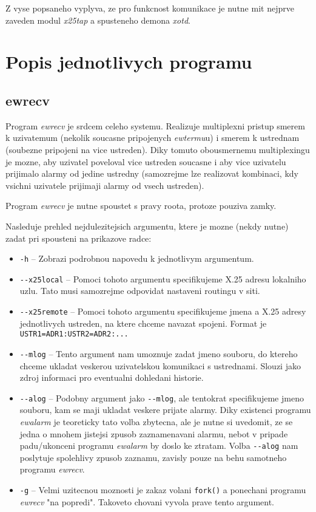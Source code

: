 \documentclass[a4paper,12pt]{article}
\begin{document}
Z vyse popsaneho vyplyva, ze pro funkcnost komunikace je nutne mit nejprve
zaveden modul \emph{x25tap} a spusteneho demona \emph{xotd}.

\section{Popis jednotlivych programu}

\subsection{ewrecv}

Program \emph{ewrecv} je srdcem celeho systemu. Realizuje multiplexni pristup
smerem k uzivatemum (nekolik soucasne pripojenych \emph{ewtermu}u) i smerem
k ustrednam (soubezne pripojeni na vice ustreden). Diky tomuto obousmernemu
multiplexingu je mozne, aby uzivatel poveloval vice ustreden soucasne i aby
vice uzivatelu prijimalo alarmy od jedine ustredny (samozrejme lze realizovat
kombinaci, kdy vsichni uzivatele prijimaji alarmy od vsech ustreden).

Program \emph{ewrecv} je nutne spoustet s pravy roota, protoze pouziva zamky.

Nasleduje prehled nejdulezitejsich argumentu, ktere je mozne (nekdy nutne)
zadat pri spousteni na prikazove radce:

\begin{itemize}
\item \verb!-h! -- Zobrazi podrobnou napovedu k jednotlivym argumentum.
\item \verb!--x25local! -- Pomoci tohoto argumentu specifikujeme X.25 adresu
lokalniho uzlu. Tato musi samozrejme odpovidat nastaveni routingu v siti.
\item \verb!--x25remote! -- Pomoci tohoto argumentu specifikujeme jmena a
X.25 adresy jednotlivych ustreden, na ktere chceme navazat spojeni. Format je
\verb!USTR1=ADR1:USTR2=ADR2:...!
\item \verb!--mlog! -- Tento argument nam umoznuje zadat jmeno souboru, do
ktereho chceme ukladat veskerou uzivatelskou komunikaci s ustrednami. Slouzi
jako zdroj informaci pro eventualni dohledani historie.
\item \verb!--alog! -- Podobny argument jako \verb!--mlog!, ale tentokrat
specifikujeme jmeno souboru, kam se maji ukladat veskere prijate alarmy.
Diky existenci programu \emph{ewalarm} je teoreticky tato volba zbytecna,
ale je nutne si uvedomit, ze se jedna o mnohem jistejsi zpusob zaznamenavani
alarmu, nebot v pripade padu/ukonceni programu \emph{ewalarm} by doslo
ke ztratam. Volba \verb!--alog! nam poslytuje spolehlivy zpusob zaznamu, zavisly
pouze na behu samotneho programu \emph{ewrecv}.
\item \verb!-g! -- Velmi uzitecnou moznosti je zakaz volani \verb!fork()!
a ponechani programu \emph{ewrecv} "na popredi". Takoveto chovani vyvola
prave tento argument.
\end{itemize}
\end{document}
